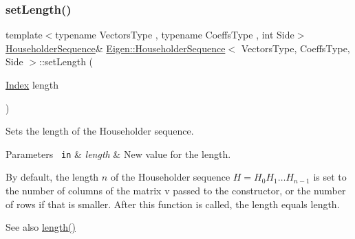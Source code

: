 \subsubsection{\texorpdfstring{setLength()}{setLength()}}
{\footnotesize\ttfamily template$<$typename Vectors\+Type , typename Coeffs\+Type , int Side$>$ \\
\mbox{\hyperlink{class_eigen_1_1_householder_sequence}{Householder\+Sequence}}\& \mbox{\hyperlink{class_eigen_1_1_householder_sequence}{Eigen\+::\+Householder\+Sequence}}$<$ Vectors\+Type, Coeffs\+Type, Side $>$\+::set\+Length (\begin{DoxyParamCaption}\item[{\mbox{\hyperlink{struct_eigen_1_1_eigen_base_a554f30542cc2316add4b1ea0a492ff02}{Index}}}]{length }\end{DoxyParamCaption})\hspace{0.3cm}{\ttfamily [inline]}}



Sets the length of the Householder sequence. 


\begin{DoxyParams}[1]{Parameters}
\mbox{\texttt{ in}}  & {\em length} & New value for the length.\\
\hline
\end{DoxyParams}
By default, the length $ n $ of the Householder sequence $ H = H_0 H_1 \ldots H_{n-1} $ is set to the number of columns of the matrix {\ttfamily v} passed to the constructor, or the number of rows if that is smaller. After this function is called, the length equals {\ttfamily length}.

\begin{DoxySeeAlso}{See also}
\mbox{\hyperlink{class_eigen_1_1_householder_sequence_ac62fad812f3893f237378fe70e55bf66}{length()}} 
\end{DoxySeeAlso}
\mbox{\label{class_eigen_1_1_householder_sequence_a2d8d996ce1085fd977850988735739f0}} 
